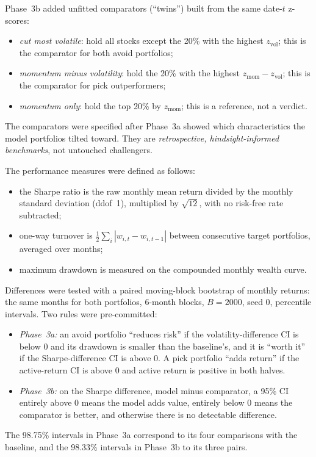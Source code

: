\documentclass[11pt]{article}
\begin{document}
Phase~3b added unfitted comparators (``twins'') built from the same date-$t$ z-scores:
\begin{itemize}
\item \emph{cut most volatile}: hold all stocks except the 20\% with the highest $z_{\text{vol}}$; this is the comparator for both avoid portfolios;
\item \emph{momentum minus volatility}: hold the 20\% with the highest $z_{\text{mom}}-z_{\text{vol}}$; this is the comparator for pick outperformers;
\item \emph{momentum only}: hold the top 20\% by $z_{\text{mom}}$; this is a reference, not a verdict.
\end{itemize}
The comparators were specified after Phase~3a showed which characteristics the model portfolios tilted toward. They are \emph{retrospective, hindsight-informed benchmarks}, not untouched challengers.

The performance measures were defined as follows:
\begin{itemize}
\item the Sharpe ratio is the raw monthly mean return divided by the monthly standard deviation (ddof~1), multiplied by $\sqrt{12}$, with no risk-free rate subtracted;
\item one-way turnover is $\tfrac12\sum_i|w_{i,t}-w_{i,t-1}|$ between consecutive target portfolios, averaged over months;
\item maximum drawdown is measured on the compounded monthly wealth curve.
\end{itemize}
Differences were tested with a paired moving-block bootstrap of monthly returns: the same months for both portfolios, 6-month blocks, $B=2000$, seed 0, percentile intervals. Two rules were pre-committed:
\begin{itemize}
\item \emph{Phase~3a:} an avoid portfolio ``reduces risk'' if the volatility-difference CI is below 0 and its drawdown is smaller than the baseline's, and it is ``worth it'' if the Sharpe-difference CI is above 0. A pick portfolio ``adds return'' if the active-return CI is above 0 and active return is positive in both halves.
\item \emph{Phase~3b:} on the Sharpe difference, model minus comparator, a 95\% CI entirely above 0 means the model adds value, entirely below 0 means the comparator is better, and otherwise there is no detectable difference.
\end{itemize}
The 98.75\% intervals in Phase~3a correspond to its four comparisons with the baseline, and the 98.33\% intervals in Phase~3b to its three pairs.
\end{document}
